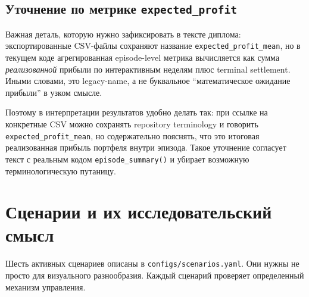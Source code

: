 \documentclass[12pt,a4paper]{article}
\begin{document}
\subsection{Уточнение по метрике \texttt{expected\_profit}}

Важная деталь, которую нужно зафиксировать в тексте диплома: экспортированные CSV-файлы сохраняют название \texttt{expected\_profit\_mean}, но в текущем коде агрегированная episode-level метрика вычисляется как сумма \emph{реализованной} прибыли по интерактивным неделям плюс terminal settlement. Иными словами, это legacy-name, а не буквальное ``математическое ожидание прибыли'' в узком смысле.

Поэтому в интерпретации результатов удобно делать так: при ссылке на конкретные CSV можно сохранять repository terminology и говорить \texttt{expected\_profit\_mean}, но содержательно пояснять, что это итоговая реализованная прибыль портфеля внутри эпизода. Такое уточнение согласует текст с реальным кодом \texttt{episode\_summary()} и убирает возможную терминологическую путаницу.

\section{Сценарии и их исследовательский смысл}

Шесть активных сценариев описаны в \texttt{configs/scenarios.yaml}. Они нужны не просто для визуального разнообразия. Каждый сценарий проверяет определенный механизм управления.
\end{document}
